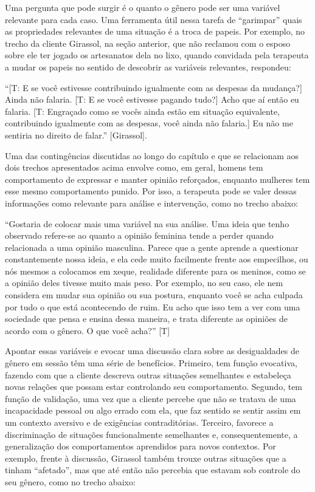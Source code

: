Uma pergunta que pode surgir é o quanto o gênero pode ser uma variável relevante para cada caso. Uma ferramenta útil nessa tarefa de ``garimpar'' quais as propriedades relevantes de uma situação é a troca de papeis. Por exemplo, no trecho da cliente Girassol, na seção anterior, que não reclamou com o esposo sobre ele ter jogado os artesanatos dela no lixo, quando convidada pela terapeuta a mudar os papeis no sentido de descobrir as variáveis relevantes, respondeu:

``[T: E se você estivesse contribuindo igualmente com as despesas da mudança?] Ainda não falaria. [T: E se você estivesse pagando tudo?] Acho que aí então eu falaria. [T: Engraçado como se vocês ainda estão em situação equivalente, contribuindo igualmente com as despesas, você ainda não falaria.] Eu não me sentiria no direito de falar.'' [Girassol].

Uma das contingências discutidas ao longo do capítulo e que se relacionam aos dois trechos apresentados acima envolve como, em geral, homens tem comportamento de expressar e manter opinião reforçados, enquanto mulheres tem esse mesmo comportamento punido. Por isso, a terapeuta pode se valer dessas informações como relevante para análise e intervenção, como no trecho abaixo:

``Gostaria de colocar mais uma variável na sua análise. Uma ideia que tenho observado refere-se ao quanto a opinião feminina tende a perder quando relacionada a uma opinião masculina. Parece que a gente aprende a questionar constantemente nossa ideia, e ela cede muito facilmente frente aos empecilhos, ou nós mesmos a colocamos em xeque, realidade diferente para os meninos, como se a opinião deles tivesse muito mais peso. Por exemplo, no seu caso, ele nem considera em mudar sua opinião ou sua postura, enquanto você se acha culpada por tudo o que está acontecendo de ruim. Eu acho que isso tem a ver com uma sociedade que pensa e ensina dessa maneira, e trata diferente as opiniões de acordo com o gênero. O que você acha?'' [T]

Apontar essas variáveis e evocar uma discussão clara sobre as desigualdades de gênero em sessão têm uma série de benefícios. Primeiro, tem função evocativa, fazendo com que a cliente descreva outras situações semelhantes e estabeleça novas relações que possam estar controlando seu comportamento. Segundo, tem função de validação, uma vez que a cliente percebe que não se tratava de uma incapacidade pessoal ou algo errado com ela, que faz sentido se sentir assim em um contexto aversivo e de exigências contraditórias. Terceiro, favorece a discriminação de situações funcionalmente semelhantes e, consequentemente, a generalização dos comportamentos aprendidos para novos contextos. Por exemplo, frente à discussão, Girassol também trouxe outras situações que a tinham ``afetado'', mas que até então não percebia que estavam sob controle do seu gênero, como no trecho abaixo: 

